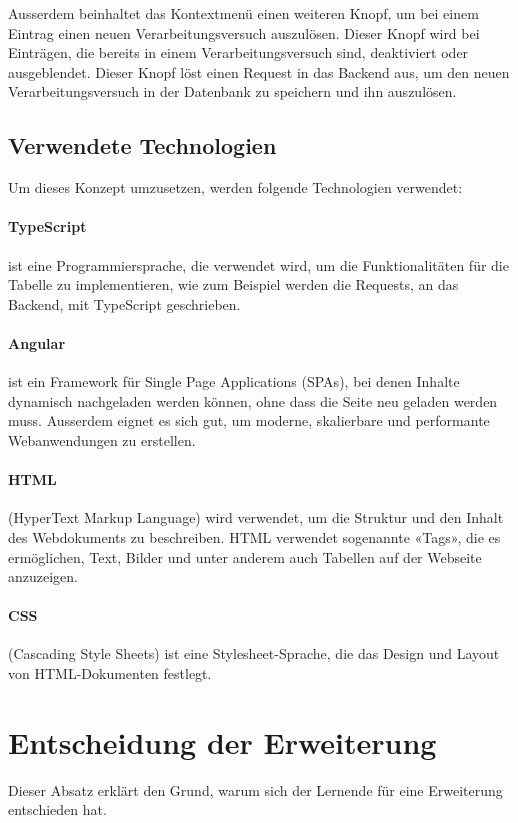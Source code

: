 Ausserdem beinhaltet das Kontextmenü einen weiteren Knopf, um bei einem Eintrag einen neuen Verarbeitungsversuch auszulösen. Dieser Knopf wird bei Einträgen, die bereits in einem Verarbeitungsversuch sind, deaktiviert oder ausgeblendet. Dieser Knopf löst einen Request in das Backend aus, um den neuen Verarbeitungsversuch in der Datenbank zu speichern und ihn auszulösen.

\subsection{Verwendete Technologien}
Um dieses Konzept umzusetzen, werden folgende Technologien verwendet:

\paragraph{TypeScript} ist eine Programmiersprache, die verwendet wird, um die Funktionalitäten für die Tabelle zu implementieren, wie zum Beispiel werden die Requests, an das Backend, mit TypeScript geschrieben.
\paragraph{Angular} ist ein Framework für Single Page Applications (SPAs), bei denen Inhalte dynamisch nachgeladen werden können, ohne dass die Seite neu geladen werden muss. Ausserdem eignet es sich gut, um moderne, skalierbare und performante Webanwendungen zu erstellen.
\paragraph{HTML} (HyperText Markup Language) wird verwendet, um die Struktur und den Inhalt des Webdokuments zu beschreiben. HTML verwendet sogenannte «Tags», die es ermöglichen, Text, Bilder und unter anderem auch Tabellen auf der Webseite anzuzeigen.
\paragraph{CSS} (Cascading Style Sheets) ist eine Stylesheet-Sprache, die das Design und Layout von HTML-Dokumenten festlegt.

\section{Entscheidung der Erweiterung}
Dieser Absatz erklärt den Grund, warum sich der Lernende für eine Erweiterung entschieden hat.

